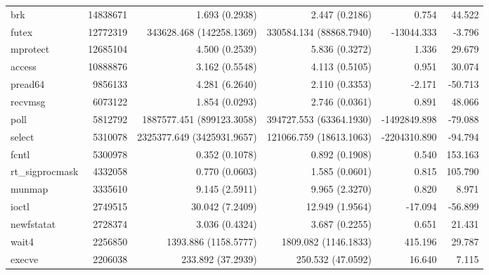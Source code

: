 \begin{longtable}{>{\ttfamily}lrrrrr}
                            brk &   14838671 &              1.693 (0.2938) &            2.447 (0.2186) &           0.754 &       44.522 \\
                          futex &   12772319 &    343628.468 (142258.1369) &   330584.134 (88868.7940) &      -13044.333 &       -3.796 \\
                       mprotect &   12685104 &              4.500 (0.2539) &            5.836 (0.3272) &           1.336 &       29.679 \\
                         access &   10888876 &              3.162 (0.5548) &            4.113 (0.5105) &           0.951 &       30.074 \\
                        pread64 &    9856133 &              4.281 (6.2640) &            2.110 (0.3353) &          -2.171 &      -50.713 \\
                        recvmsg &    6073122 &              1.854 (0.0293) &            2.746 (0.0361) &           0.891 &       48.066 \\
                           poll &    5812792 &   1887577.451 (899123.3058) &   394727.553 (63364.1930) &    -1492849.898 &      -79.088 \\
                         select &    5310078 &  2325377.649 (3425931.9657) &   121066.759 (18613.1063) &    -2204310.890 &      -94.794 \\
                          fcntl &    5300978 &              0.352 (0.1078) &            0.892 (0.1908) &           0.540 &      153.163 \\
                rt\_sigprocmask &    4332058 &              0.770 (0.0603) &            1.585 (0.0601) &           0.815 &      105.790 \\
                         munmap &    3335610 &              9.145 (2.5911) &            9.965 (2.3270) &           0.820 &        8.971 \\
                          ioctl &    2749515 &             30.042 (7.2409) &           12.949 (1.9564) &         -17.094 &      -56.899 \\
                     newfstatat &    2728374 &              3.036 (0.4324) &            3.687 (0.2255) &           0.651 &       21.431 \\
                          wait4 &    2256850 &        1393.886 (1158.5777) &      1809.082 (1146.1833) &         415.196 &       29.787 \\
                         execve &    2206038 &           233.892 (37.2939) &         250.532 (47.0592) &          16.640 &        7.115 \\

\end{longtable}
